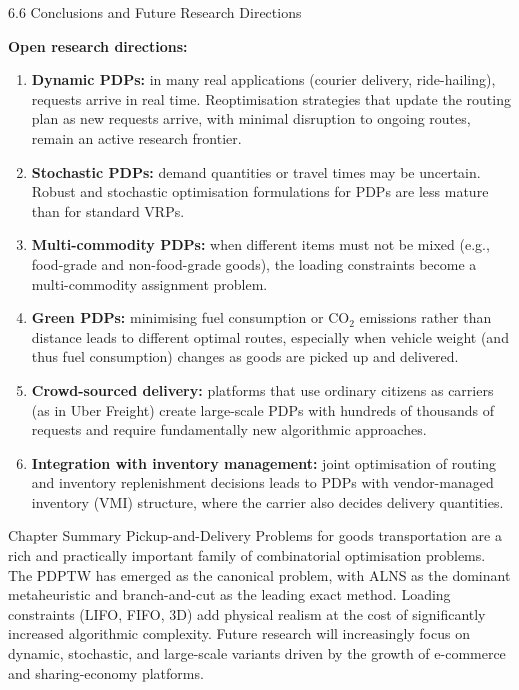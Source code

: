 \documentclass[aspectratio=169,10pt]{beamer}
\begin{document}
\begin{frame}[allowframebreaks]{6.6 Conclusions and Future Research Directions}
  \framebreak

  \textbf{Open research directions:}

  \begin{enumerate}
    \item \textbf{Dynamic PDPs:} in many real applications (courier delivery, ride-hailing),
          requests arrive in real time. Reoptimisation strategies that update the routing
          plan as new requests arrive, with minimal disruption to ongoing routes, remain
          an active research frontier.
    \item \textbf{Stochastic PDPs:} demand quantities or travel times may be uncertain.
          Robust and stochastic optimisation formulations for PDPs are less mature than
          for standard VRPs.
    \item \textbf{Multi-commodity PDPs:} when different items must not be mixed (e.g.,
          food-grade and non-food-grade goods), the loading constraints become a
          multi-commodity assignment problem.
    \item \textbf{Green PDPs:} minimising fuel consumption or CO$_2$ emissions rather
          than distance leads to different optimal routes, especially when vehicle weight
          (and thus fuel consumption) changes as goods are picked up and delivered.
    \item \textbf{Crowd-sourced delivery:} platforms that use ordinary citizens as
          carriers (as in Uber Freight) create large-scale PDPs with hundreds of
          thousands of requests and require fundamentally new algorithmic approaches.
    \item \textbf{Integration with inventory management:} joint optimisation of
          routing and inventory replenishment decisions leads to PDPs with vendor-managed
          inventory (VMI) structure, where the carrier also decides delivery quantities.
  \end{enumerate}

  \begin{alertblock}{Chapter Summary}
    Pickup-and-Delivery Problems for goods transportation are a rich and practically
    important family of combinatorial optimisation problems. The PDPTW has emerged as
    the canonical problem, with ALNS as the dominant metaheuristic and branch-and-cut
    as the leading exact method. Loading constraints (LIFO, FIFO, 3D) add physical
    realism at the cost of significantly increased algorithmic complexity.
    Future research will increasingly focus on dynamic, stochastic, and large-scale
    variants driven by the growth of e-commerce and sharing-economy platforms.
  \end{alertblock}

\end{frame}
\end{document}
